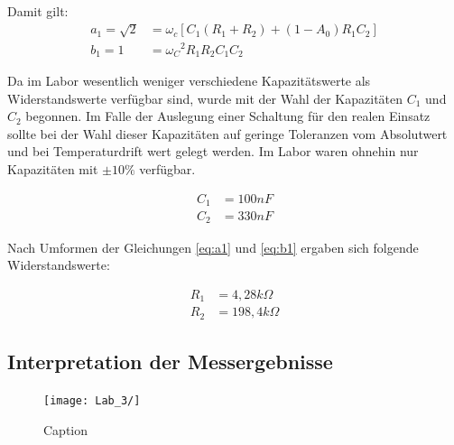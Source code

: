 Damit gilt: 
\begin{align}
    a_1 = \sqrt{2} &= \omega_c[C_1(R_1+R_2) + (1-A_0)R_1C_2] \label{eq:a1}\\
    b_1 = 1 &= {\omega_C}^2R_1R_2C_1C_2 \label{eq:b1}
\end{align}

Da im Labor wesentlich weniger verschiedene Kapazitätswerte als Widerstandswerte verfügbar sind, wurde mit der Wahl der Kapazitäten $C_1$ und $C_2$ begonnen. Im Falle der Auslegung einer Schaltung für den realen Einsatz sollte bei der Wahl dieser Kapazitäten auf geringe Toleranzen vom Absolutwert und bei Temperaturdrift wert gelegt werden. Im Labor waren ohnehin nur Kapazitäten mit $\pm10\%$ verfügbar. 

\begin{align}
    C_1 &= 100nF \\
    C_2 &= 330nF
\end{align}

Nach Umformen der Gleichungen \ref{eq:a1} und \ref{eq:b1} ergaben sich folgende Widerstandswerte:

\begin{align}
    R_1 &= 4,28k\Omega \\
    R_2 &= 198,4 k\Omega
\end{align}



\subsection{Interpretation der Messergebnisse}
\begin{figure}
    \centering
    \texttt{[image: Lab\_3/]}
    \caption{Caption}
    \label{fig:my_label}
\end{figure}